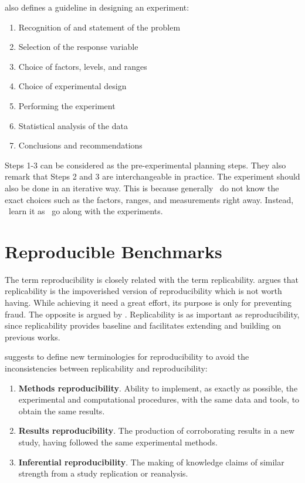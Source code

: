 \citet{montgomeryDesignAnalysisExperiments2013} also defines a guideline in designing an experiment:

\begin{enumerate}[noitemsep]
	\item Recognition of and statement of the problem
	\item Selection of the response variable
	\item Choice of factors, levels, and ranges
	\item Choice of experimental design
	\item Performing the experiment
	\item Statistical analysis of the data
	\item Conclusions and recommendations
\end{enumerate}

Steps 1-3 can be considered as the pre-experimental planning steps.
They also remark that Steps 2 and 3 are interchangeable in practice.
The experiment should also be done in an iterative way.
This is because generally \first~do not know the exact choices such as the factors, ranges, and measurements right away.
Instead, \first~learn it as \first~go along with the experiments.


\section{Reproducible Benchmarks}
\label{sec:reproducibleBenchmarks}

The term reproducibility is closely related with the term replicability.
\citet{drummondReplicabilityNotReproducibility2009} argues that replicability is the impoverished version of reproducibility which is not worth having.
While achieving it need a great effort, its purpose is only for preventing fraud.
The opposite is argued by \citet{vitekR3RepeatabilityReproducibility2012}.
Replicability is as important as reproducibility, since replicability provides baseline and facilitates extending and building on previous works.


\citet{goodmanWhatDoesResearch2016} suggests to define new terminologies for reproducibility to avoid the inconsistencies between replicability and reproducibility:
\begin{enumerate}
	\item \textbf{Methods reproducibility}. Ability to implement, as exactly as possible, the experimental and computational procedures, with the same data and tools, to obtain the same results.
	\item \textbf{Results reproducibility}. The production of corroborating results in a new study, having followed the same experimental methods.
	\item \textbf{Inferential reproducibility}. The making of knowledge claims of similar strength from a study replication or reanalysis.
\end{enumerate}


